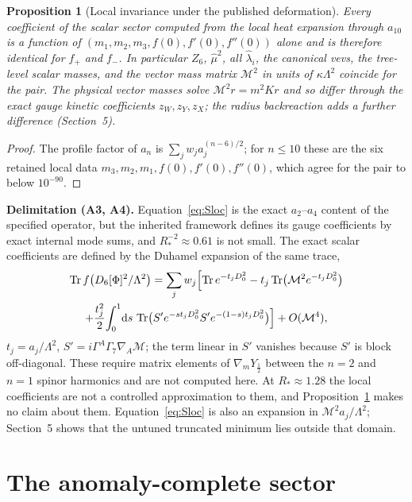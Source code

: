 \documentclass[11pt,letterpaper]{article}
\newtheorem{proposition}{Proposition}
\DeclareMathOperator{\Tr}{Tr}
\newcommand{\dd}{\mathrm d}
\newcommand{\Mb}{\mathcal M}
\newcommand{\Lam}{\Lambda}
\newcommand{\hmu}{\hat\mu}
\begin{document}
\begin{proposition}[Local invariance under the published deformation]\label{prop:invariance}
Every coefficient of the scalar sector computed from the local heat expansion through $a_{10}$ is a function of $(m_1,m_2,m_3,f(0),f'(0),f''(0))$ alone and is therefore identical for $f_+$ and $f_-$. In particular $Z_6$, $\hmu^2$, all $\hat\lambda_i$, the canonical vevs, the tree-level scalar masses, and the vector mass matrix $\Mb^2$ in units of $\kappa\Lam^2$ coincide for the pair. The physical vector masses solve $\Mb^2r=m^2Kr$ and so differ through the exact gauge kinetic coefficients $z_W,z_Y,z_X$; the radius backreaction adds a further difference (Section~5).
\end{proposition}
\begin{proof}
The profile factor of $a_n$ is $\sum_jw_ja_j^{(n-6)/2}$; for $n\le10$ these are the six retained local data $m_3,m_2,m_1,f(0),f'(0),f''(0)$, which agree for the pair to below $10^{-90}$.
\end{proof}

\textbf{Delimitation (A3, A4).} Equation~\eqref{eq:Sloc} is the exact $a_2$--$a_4$ content of the specified operator, but the inherited framework defines its gauge coefficients by exact internal mode sums, and $R_*^{-2}\approx0.61$ is not small. The exact scalar coefficients are defined by the Duhamel expansion of the same trace,
\begin{multline}
\Tr f\bigl(D_6[\Phi]^2/\Lam^2\bigr)=\sum_jw_j\Bigl[\Tr e^{-t_jD_0^2}-t_j\Tr\bigl(\Mb^2e^{-t_jD_0^2}\bigr)\\
+\frac{t_j^2}2\!\int_0^1\!\dd s\,\Tr\bigl(S'e^{-st_jD_0^2}S'e^{-(1-s)t_jD_0^2}\bigr)\Bigr]+O(\Mb^4),
\label{eq:duhamel}
\end{multline}
$t_j=a_j/\Lam^2$, $S'=i\Gamma^A\Gamma_7\nabla_A\Mb$; the term linear in $S'$ vanishes because $S'$ is block off-diagonal. These require matrix elements of $\nabla_mY_{\frac12}$ between the $n=2$ and $n=1$ spinor harmonics and are not computed here. At $R_*\approx1.28$ the local coefficients are not a controlled approximation to them, and Proposition~\ref{prop:invariance} makes no claim about them. Equation~\eqref{eq:Sloc} is also an expansion in $\Mb^2a_j/\Lam^2$; Section~5 shows that the untuned truncated minimum lies outside that domain.

\section{The anomaly-complete sector}
\end{document}
